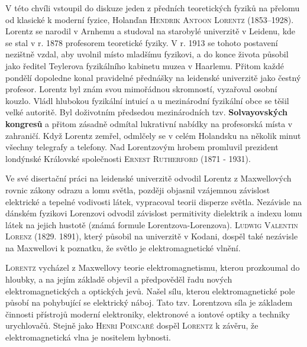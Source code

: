       V této chvíli vstoupil do diskuze jeden z předních teoretických fyziků na přelomu od klasické
      k moderní fyzice, Holanďan \textsc{Hendrik Antoon Lorentz} (1853–1928). Lorentz se narodil v
      Arnhemu a studoval na starobylé univerzitě v Leidenu, kde se stal v r. 1878 profesorem
      teoretické fyziky. V r. 1913 se tohoto postavení nezištně vzdal, aby uvolnil místo mladšímu
      fyzikovi, a do konce života působil jako ředitel Teylerova fyzikálního kabinetu muzea v
      Haarlemu. Přitom každé pondělí dopoledne konal pravidelné přednášky na leidenské univerzitě
      jako čestný profesor. Lorentz byl znám svou mimořádnou skromností, vyzařoval osobní kouzlo.
      Vládl hlubokou fyzikální intuicí a u mezinárodní fyzikální obce se těšil velké autoritě. Byl
      doživotním předsedou mezinárodních tzv. \textbf{Solvayovských kongresů} a přitom zásadně
      odmítal lukrativní nabídky na profesorská místa v zahraničí. Když Lorentz zemřel, odmlčely se
      v celém Holandsku na několik minut všechny telegrafy a telefony. Nad Lorentzovým hrobem
      promluvil prezident londýnské Královské společnosti \textsc{Ernest Rutherford} (1871 - 1931).

      \begin{tcnote}
        Ve své disertační práci na leidenské univerzitě odvodil Lorentz z Maxwellových rovnic zákony
        odrazu a lomu světla, později objasnil vzájemnou závislost elektrické a tepelné vodivosti
        látek, vypracoval teorii disperze světla. Nezávisle na dánském fyzikovi Lorenzovi odvodil
        závislost permitivity dielektrik a indexu lomu látek na jejich hustotě (známá formule
        Lorentzova-Lorenzova). \textsc{Ludwig Valentin Lorenz} (1829. 1891), který působil na
        univerzitě v Kodani, dospěl také nezávisle na Maxwellovi k poznatku, že světlo je
        elektromagnetické vlnění.
      \end{tcnote}

      \textsc{Lorentz} vycházel z Maxwellovy teorie elektromagnetismu, kterou prozkoumal do hloubky,
      a na jejím základě objevil a předpověděl řadu nových elektromagnetických a optických jevů.
      Našel sílu, kterou elektromagnetické pole působí na pohybující se elektrický náboj. Tato tzv.
      Lorentzova síla je základem činnosti přístrojů moderní elektroniky, elektronové a iontové
      optiky a techniky urychlovačů. Stejně jako \textsc{Henri Poincaré} dospěl \textsc{Lorentz} k
      závěru, že elektromagnetická vlna je nositelem hybnosti.

